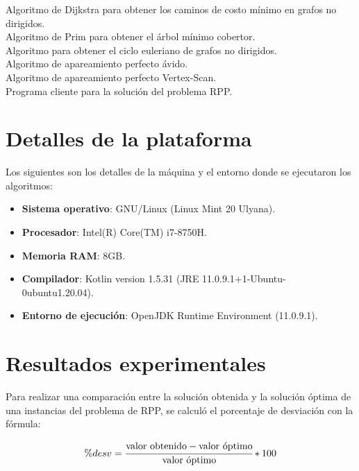 \documentclass[11pt]{article}
\begin{document}
Algoritmo de Dijkstra para obtener los caminos de costo mínimo en grafos no dirigidos. \\

Algoritmo de Prim para obtener el árbol mínimo cobertor.\\

Algoritmo para obtener el ciclo euleriano de grafos no dirigidos.\\

Algoritmo de apareamiento perfecto ávido.\\

Algoritmo de apareamiento perfecto Vertex-Scan.\\

Programa cliente para la solución del problema RPP.\\


\section{Detalles de la plataforma}
Los siguientes son los detalles de la máquina y el entorno donde se ejecutaron los algoritmos:

\begin{itemize}
   \item \textbf{Sistema operativo}: GNU/Linux (Linux Mint 20 Ulyana).
   \item \textbf{Procesador}: Intel(R) Core(TM) i7-8750H.
   \item \textbf{Memoria RAM}: 8GB.
   \item \textbf{Compilador}: Kotlin version 1.5.31 (JRE 11.0.9.1+1-Ubuntu-0ubuntu1.20.04).
   \item \textbf{Entorno de ejecución}: OpenJDK Runtime Environment (11.0.9.1).
\end{itemize}

\section{Resultados experimentales}

Para realizar una comparación entre la solución obtenida y la solución óptima de una instancias
del problema de RPP, se calculó el porcentaje de desviación con la fórmula:

\begin{equation}
    \%desv = \cfrac{\text{valor obtenido} - \text{valor óptimo}}{\text{valor óptimo}} *100
\end{equation}
\end{document}
